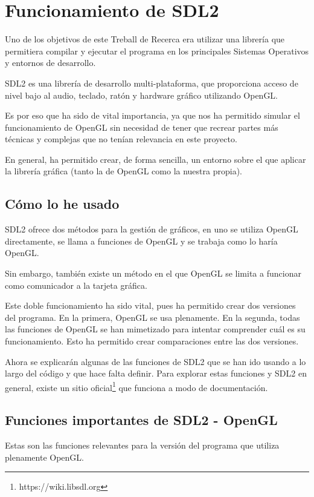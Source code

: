 \section{Funcionamiento de SDL2}
Uno de los objetivos de este Treball de Recerca era utilizar una librería que permitiera compilar y ejecutar el programa en los principales Sistemas Operativos y entornos de desarrollo.

SDL2 es una librería de desarrollo multi-plataforma, que proporciona acceso de nivel bajo al audio, teclado, ratón y hardware gráfico utilizando OpenGL.

Es por eso que ha sido de vital importancia, ya que nos ha permitido simular el funcionamiento de OpenGL sin necesidad de tener que recrear partes más técnicas y complejas que no tenían relevancia en este proyecto.

En general, ha permitido crear, de forma sencilla, un entorno sobre el que aplicar la librería gráfica (tanto la de OpenGL como la nuestra propia).

\subsection{Cómo lo he usado}
SDL2 ofrece dos métodos para la gestión de gráficos, en uno se utiliza OpenGL directamente, se llama a funciones de OpenGL y se trabaja como lo haría OpenGL.

Sin embargo, también existe un método en el que OpenGL se limita a funcionar como comunicador a la tarjeta gráfica.

Este doble funcionamiento ha sido vital, pues ha permitido crear dos versiones del programa. En la primera, OpenGL se usa plenamente. En la segunda, todas las funciones de OpenGL se han mimetizado para intentar comprender cuál es su funcionamiento. Esto ha permitido crear comparaciones entre las dos versiones.


Ahora se explicarán algunas de las funciones de SDL2 que se han ido usando a lo largo del código y que hace falta definir. Para explorar estas funciones y SDL2 en general, existe un sitio oficial\footnote{https://wiki.libsdl.org} que funciona a modo de documentación.


\subsection{Funciones importantes de SDL2 - OpenGL}
Estas son las funciones relevantes para la versión del programa que utiliza plenamente OpenGL.


